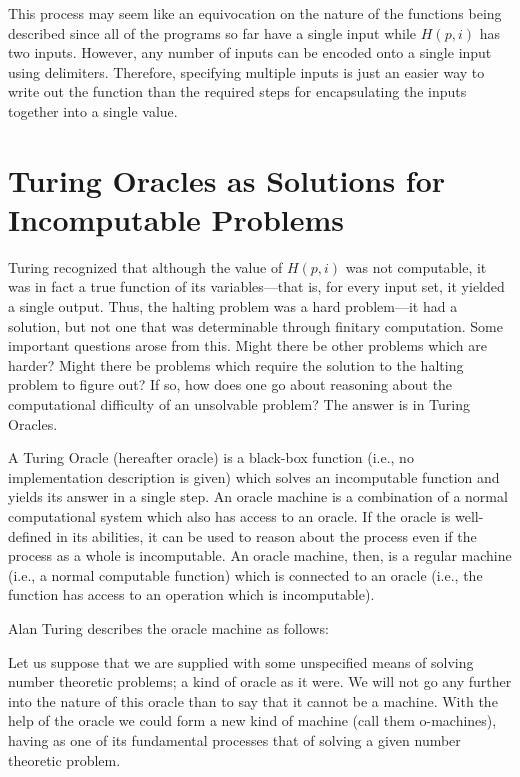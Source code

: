 This process may seem like an equivocation on the nature of the functions being described
since all of the programs so far have a single input while $H(p, i)$ has two inputs.  However, any number of inputs can be encoded onto a single input using delimiters.  Therefore, specifying multiple inputs is just an easier way to write out the function than the required steps for encapsulating the inputs together into a single value.

\section{Turing Oracles as Solutions for Incomputable Problems}

Turing recognized that although the value of $H(p, i)$ was not computable, it was in fact a true function of its variables---that is, for every input set, it yielded a single output.  Thus, the halting problem was a hard problem---it had a solution, but not one that was determinable through finitary computation.  Some important questions arose from this.  Might there be other problems which are harder?  Might there be problems which require the solution to the halting problem to figure out?  If so, how does one go about reasoning about the computational difficulty of an unsolvable problem?  The answer is in Turing Oracles.

A Turing Oracle (hereafter oracle) is a black-box function (i.e., no implementation description is given) which solves an incomputable function and yields its answer in a single step.  An oracle machine is a combination of a normal computational system which also has access to an oracle.  If the oracle is well-defined in its abilities, it can be used to reason about the process even if the process as a whole is incomputable.  An oracle machine, then, is a regular machine (i.e., a normal computable function) which is connected to an oracle (i.e., the function has access to an operation which is incomputable).

Alan Turing describes the oracle machine as follows:

\begin{quoting}
Let us suppose that we are supplied with some unspecified means of solving number theoretic problems; a kind of oracle as it were.  We will not go any further into the nature of this oracle than to say that it cannot be a machine.  With the help of the oracle we could form a new kind of machine (call them o-machines), having as one of its fundamental processes that of solving a given number theoretic problem. \citep[][\S{}4]{turing1939}
\end{quoting}

